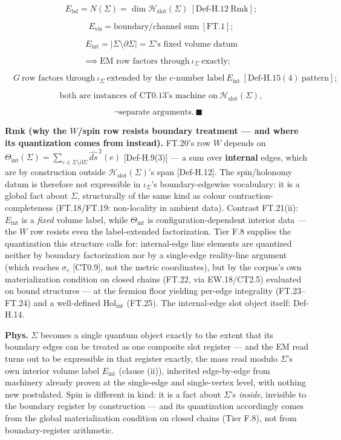 \begin{theorem}
\[
\quad E_{\mathrm{bd}}=N(\Sigma)=\dim\mathcal H_{\mathrm{slot}}(\Sigma)\ [\mathrm{Def\text{-}H.12}\ \mathrm{Rmk}];
\]

\[
\quad E_{\mathrm{vis}}=\text{boundary/channel sum}\ [\mathrm{FT.1}];
\]

\[
\quad E_{\mathrm{int}}=|\Sigma\setminus\partial\Sigma|=\Sigma\text{'s fixed volume datum}
\]

\[
\implies\text{EM row factors through}\ \iota_\Sigma\ \text{exactly};
\]

\[
\quad G\ \text{row factors through}\ \iota_\Sigma\ \text{extended by the c-number label}\ E_{\mathrm{int}}\ [\mathrm{Def\text{-}H.15}(4)\ \text{pattern}];
\]

\[
\quad\text{both are instances of CT0.13's machine on}\ \mathcal H_{\mathrm{slot}}(\Sigma),
\]

\[
\ \neg\text{separate arguments}.\ \blacksquare
\]

\textbf{Rmk (why the $W$/spin row resists boundary treatment — and where its quantization comes from instead).} FT.20's row $W$ depends on $\Theta_{\mathrm{int}}(\Sigma)=\sum_{e\in\Sigma\setminus\partial\Sigma}\widehat{ds}^{\,2}(e)$ [Def-H.9(3)] — a sum over \textbf{internal} edges, which are by construction outside $\mathcal H_{\mathrm{slot}}(\Sigma)$'s span [Def-H.12]. The spin/holonomy datum is therefore not expressible in $\iota_\Sigma$'s boundary-edgewise vocabulary: it is a global fact about $\Sigma$, structurally of the same kind as colour contraction-completeness (FT.18/FT.19: non-locality in ambient data). Contrast FT.21(ii): $E_{\mathrm{int}}$ is a \textit{fixed} volume label, while $\Theta_{\mathrm{int}}$ is configuration-dependent interior data — the $W$ row resists even the label-extended factorization. Tier F.8 supplies the quantization this structure calls for: internal-edge line elements are quantized neither by boundary factorization nor by a single-edge reality-line argument (which reaches $\sigma_e$ [CT0.9], not the metric coordinates), but by the corpus's own materialization condition on closed chains (FT.22, via EW.18/CT2.5) evaluated on bound structures — at the fermion floor yielding per-edge integrality (FT.23–FT.24) and a well-defined $\mathrm{Hol}_{\mathrm{int}}$ (FT.25). The internal-edge slot object itself: Def-H.14.

\textbf{Phys.} $\Sigma$ becomes a single quantum object exactly to the extent that its boundary edges can be treated as one composite slot register — and the EM read turns out to be expressible in that register exactly, the mass read modulo $\Sigma$'s own interior volume label $E_{\mathrm{int}}$ (clause (ii)), inherited edge-by-edge from machinery already proven at the single-edge and single-vertex level, with nothing new postulated. Spin is different in kind: it is a fact about $\Sigma$'s \textit{inside}, invisible to the boundary register by construction — and its quantization accordingly comes from the global materialization condition on closed chains (Tier F.8), not from boundary-register arithmetic.


\end{theorem}
